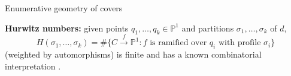 \documentclass{beamer}
\renewcommand{\P}{\mathbb P}
\theoremstyle{definition}
\begin{document}
                                                                                                                                                                                                                          \begin{frame}{Enumerative geometry of covers}

                                                                                                                                                                                                                                                                                                                                                                                                                          {\bf Hurwitz numbers:}
                                                                                                                                                                                                                              given points $q_1,\dots,q_k\in\P^1$ and
                                                                                                                                                                                                                              partitions $\sigma_1,\dots,\sigma_k$ of $d$,
                                                                                                                                                                                                                              \[
                                                                                                                                                                                                                              H(\sigma_1, \dots,\sigma_k)=\#\{C\xrightarrow{f}\P^1:f\text{ is ramified over }q_i\text{ with profile }\sigma_i\}                                                                                                                                                                                           \]
                                                                                                                                                                                                                              (weighted by automorphisms) is finite and has a known combinatorial interpretation \cite{Completed}.





\end{frame}
\end{document}
